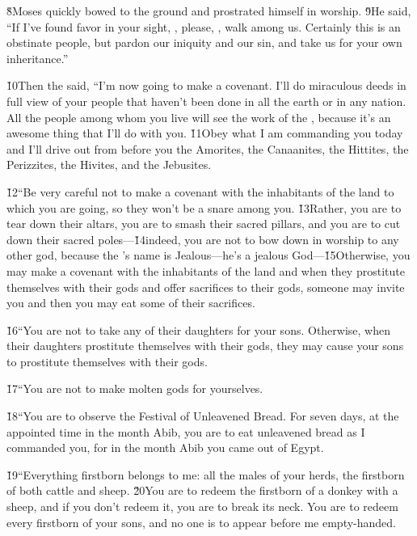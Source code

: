 \v{8}Moses quickly bowed to the ground and prostrated himself in worship. \v{9}He said, ``If I've found favor in your sight, , please, , walk among us. Certainly this is an obstinate people, but pardon our iniquity and our sin, and take us for your own inheritance.''

\v{10}Then the  said, ``I'm now going to make a covenant. I'll do miraculous deeds in full view of your people that haven't been done in all the earth or in any nation. All the people among whom you live will see the work of the , because it's an awesome thing that I'll do with you. \v{11}Obey what I am commanding you today and I'll drive out from before you the Amorites, the Canaanites, the Hittites, the Perizzites, the Hivites, and the Jebusites.

\v{12}``Be very careful not to make a covenant with the inhabitants of the land to which you are going, so they won't be a snare among you. \v{13}Rather, you are to tear down their altars, you are to smash their sacred pillars, and you are to cut down their sacred poles---\v{14}indeed, you are not to bow down in worship to any other god, because the 's name is Jealous---he's a jealous God---\v{15}Otherwise, you may make a covenant with the inhabitants of the land and when they prostitute themselves with their gods and offer sacrifices to their gods, someone may invite you and then you may eat some of their sacrifices.

\v{16}``You are not to take any of their daughters for your sons. Otherwise, when their daughters prostitute themselves with their gods, they may cause your sons to prostitute themselves with their gods.

\v{17}``You are not to make molten gods for yourselves.

\v{18}``You are to observe the Festival of Unleavened Bread. For seven days, at the appointed time in the month Abib, you are to eat unleavened bread as I commanded you, for in the month Abib you came out of Egypt.

\v{19}``Everything firstborn belongs to me: all the males of your herds, the firstborn of both cattle and sheep. \v{20}You are to redeem the firstborn of a donkey with a sheep, and if you don't redeem it, you are to break its neck. You are to redeem every firstborn of your sons, and no one is to appear before me empty-handed.

